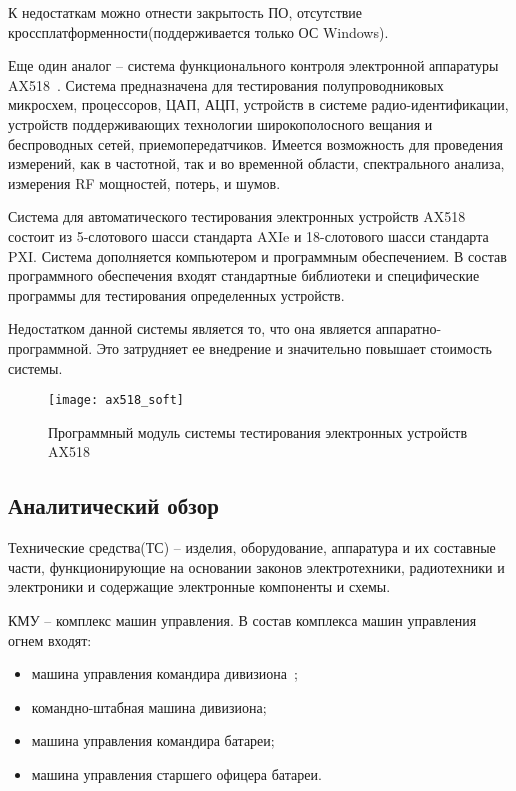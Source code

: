 К недостаткам можно отнести закрытость ПО, отсутствие кроссплатформенности(поддерживается только ОС Windows).

Еще один аналог -- система функционального контроля электронной аппаратуры AX518~\cite{AX518}. Система предназначена для тестирования полупроводниковых микросхем, процессоров, ЦАП, АЦП, устройств в системе радио-идентификации, устройств поддерживающих технологии широкополосного вещания и беспроводных сетей, приемопередатчиков.
Имеется возможность для проведения измерений, как в частотной, так и во временной области, спектрального анализа, измерения RF мощностей, потерь, и шумов.

Система для автоматического тестирования электронных устройств \break AX518 состоит из 5-слотового шасси стандарта AXIe и 18-слотового шасси стандарта PXI.
Система дополняется компьютером и программным обеспечением.
В состав программного обеспечения входят стандартные библиотеки и специфические программы для тестирования определенных устройств.

Недостатком данной системы является то, что она является аппаратно-программной. Это затрудняет ее внедрение и
значительно повышает стоимость системы.

\begin{figure}[ht]
	\centering
	\texttt{[image: ax518\_soft]}
	\caption{Программный модуль системы тестирования электронных устройств AX518~\cite{AX518}}
	\label{fig:lit_reiview:analogues:ax518_soft}
\end{figure}

\subsection{Аналитический обзор}
\label{sub:lit_review:analitics}
Технические средства(ТС) --  изделия, оборудование, аппаратура и их составные части, функционирующие на основании законов электротехники, радиотехники и электроники и содержащие электронные компоненты и схемы.

КМУ -- комплекс машин управления.
В состав комплекса машин управления огнем входят:
\begin{itemize}
	\item машина управления командира дивизиона~\cite{div_car};
	\item командно-штабная машина дивизиона;
	\item машина управления командира батареи;
	\item машина управления старшего офицера батареи.
\end{itemize}

